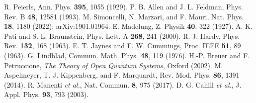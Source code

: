 \documentclass[12pt]{article}
\begin{document}

\begin{thebibliography}{99}
 R. Peierls, Ann. Phys. \textbf{395}, 1055 (1929).
 P. B. Allen and J. L. Feldman, Phys. Rev. B \textbf{48}, 12581 (1993).
 M. Simoncelli, N. Marzari, and F. Mauri, Nat. Phys. \textbf{18}, 1180 (2022); arXiv:1901.01964.
 E. Madelung, Z. Physik \textbf{40}, 322 (1927).
 A. K. Pati and S. L. Braunstein, Phys. Lett. A \textbf{268}, 241 (2000).
 R. J. Hardy, Phys. Rev. \textbf{132}, 168 (1963).
 E. T. Jaynes and F. W. Cummings, Proc. IEEE \textbf{51}, 89 (1963).
 G. Lindblad, Commun. Math. Phys. \textbf{48}, 119 (1976).
 H.-P. Breuer and F. Petruccione, \textit{The Theory of Open Quantum Systems}, Oxford (2002).
 M. Aspelmeyer, T. J. Kippenberg, and F. Marquardt, Rev. Mod. Phys. \textbf{86}, 1391 (2014).
 R. Manenti \textit{et al.}, Nat. Commun. \textbf{8}, 975 (2017).
 D. G. Cahill \textit{et al.}, J. Appl. Phys. \textbf{93}, 793 (2003).
\end{thebibliography}
\end{document}
